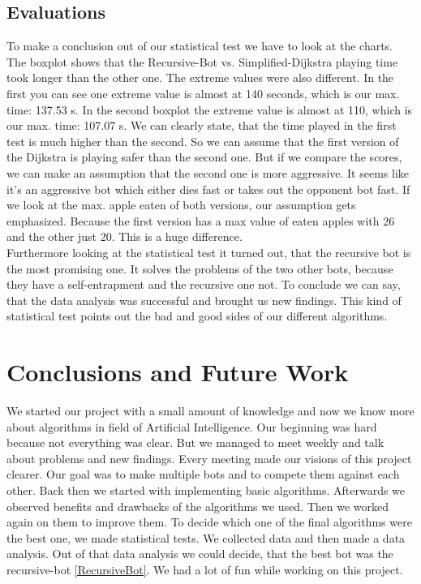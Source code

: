 \documentclass[a4paper,12pt]{article}
\begin{document}
\subsection{Evaluations}
To make a conclusion out of our statistical test we have to look at the charts. The boxplot shows that the Recursive-Bot vs. Simplified-Dijkstra playing time took longer than the other one. The extreme values were also different. In the first you can see one extreme value is almost at 140 seconds, which is our max. time: 137.53 s. In the second boxplot the extreme value is almost at 110, which is our max. time: 107.07 s. We can clearly state, that the time played in the first test is much higher than the second. So we can assume that the first version of the Dijkstra is playing safer than the second one. But if we compare the scores, we can make an assumption that the second one is more aggressive. It seems like it's an aggressive bot which either dies fast or takes out the opponent bot fast. If we look at the max. apple eaten of both versions, our assumption gets emphasized. Because the first version has a max value of eaten apples with 26 and the other just 20. This is a huge difference.\\
Furthermore looking at the statistical test it turned out, that the recursive bot is the most promising one. It solves the problems of the two other bots, because they have a self-entrapment and the recursive one not.
To conclude we can say, that the data analysis was successful and brought us new findings. This kind of statistical test points out the bad and good sides of our different algorithms. 

\section{Conclusions and Future Work}
We started our project with a small amount of knowledge and now we know more about algorithms in field of Artificial Intelligence. Our beginning was hard because not everything was clear. But we managed to meet weekly and talk about problems and new findings. Every meeting made our visions of this project clearer. Our goal was to make multiple bots and to compete them against each other. Back then we started with implementing basic algorithms. Afterwards we observed benefits and drawbacks of the algorithms we used. Then we worked again on them to improve them. To decide which one of the final algorithms were the best one, we made statistical tests. We collected data and then made a data analysis. Out of that data analysis we could decide, that the best bot was the recursive-bot \ref{RecursiveBot}. We had a lot of fun while working on this project.
\end{document}
